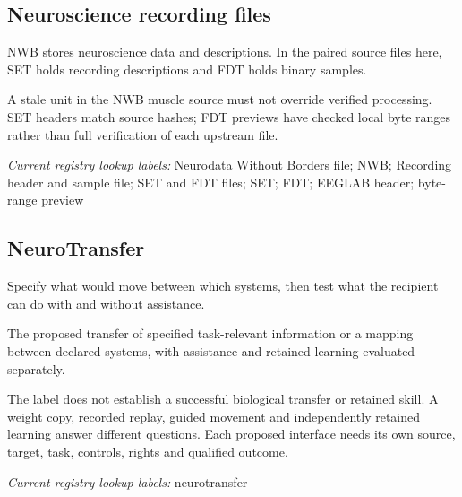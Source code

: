 \begin{samepage}
\subsection*{Neuroscience recording files}
\noindent NWB stores neuroscience data and descriptions. In the paired source files here, SET holds recording descriptions and FDT holds binary samples.\par
\end{samepage}
\begin{samepage}
\noindent A stale unit in the NWB muscle source must not override verified processing. SET headers match source hashes; FDT previews have checked local byte ranges rather than full verification of each upstream file.\par\nopagebreak[4]

\end{samepage}


\noindent\textit{Current registry lookup labels:} Neurodata Without Borders file; NWB; Recording header and sample file; SET and FDT files; SET; FDT; EEGLAB header; byte-range preview\par

\begin{samepage}
\subsection*{NeuroTransfer}
\noindent Specify what would move between which systems, then test what the recipient can do with and without assistance.\par
\end{samepage}
\noindent The proposed transfer of specified task-relevant information or a mapping between declared systems, with assistance and retained learning evaluated separately.\par
\begin{samepage}
\noindent The label does not establish a successful biological transfer or retained skill. A weight copy, recorded replay, guided movement and independently retained learning answer different questions. Each proposed interface needs its own source, target, task, controls, rights and qualified outcome.\par\nopagebreak[4]

\end{samepage}


\noindent\textit{Current registry lookup labels:} neurotransfer\par

